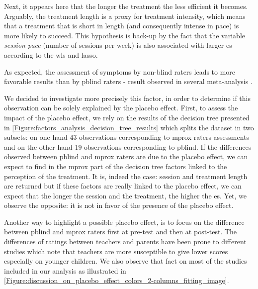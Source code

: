 Next, it appears here that the longer the treatment the less efficient it becomes. Arguably, the treatment length is a proxy 
for treatment intensity, which means that a treatment that is short in length (and consequently intense in pace) 
is more likely to succeed. This hypothesis is back-up by the fact that the variable \emph{session pace} (number of sessions per week) 
is also associated with larger \gls{es} according to the \gls{wls} and \gls{lasso}. 

As expected, the assessment of symptoms by non-blind raters leads to more favorable results than by \gls{pblind} raters - 
result observed in several meta-analysis \citep{Cortese2016, Micoulaud2014}. 

We decided to investigate more precisely this factor, in order to determine if this observation can be solely explained by
the placebo effect. First, to assess the impact of the placebo effect, we rely on the results of the decision tree 
presented in \cref{Figure:factors_analysis_decision_tree_results} which splits the dataset in two subsets: on one hand 43 observations corresponding 
to \gls{mprox} raters assessments and on the other hand 19 observations corresponding to \gls{pblind}. If the differences observed 
between \gls{pblind} and \gls{mprox} raters are due to the placebo effect, we can expect to find in the \gls{mprox} part of the decision 
tree factors linked to the perception of the treatment. It is, indeed the case: session and treatment length are returned but if
these factors are really linked to the placebo effect, we can expect that the longer the session and the treatment, the higher the \gls{es}. 
Yet, we observe the opposite: it is not in favor of the presence of the placebo effect. 

Another way to highlight a possible placebo effect, is to focus on the difference between \gls{pblind} and \gls{mprox} raters first at pre-test 
and then at post-test. The differences of ratings between teachers and parents have been prone to different studies \citep{Sollie2013, Narad2015}
which note that teachers are more susceptible to give lower scores especially on younger children. We also observe that fact on most of the studies included 
in our analysis as illustrated in \cref{Figure:discussion_on_placebo_effect_colors_2-columns_fitting_image}.  

